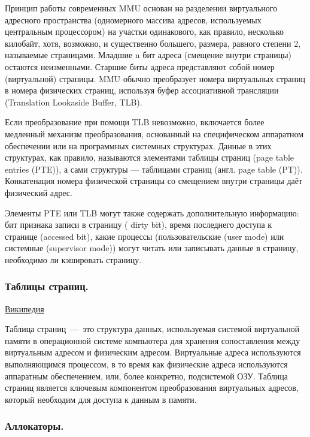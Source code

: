 Принцип работы современных MMU основан на разделении виртуального адресного пространства (одномерного массива адресов, используемых центральным процессором) на участки одинакового, как правило, несколько килобайт, хотя, возможно, и существенно большего, размера, равного степени 2, называемые страницами. Младшие n бит адреса (смещение внутри страницы) остаются неизменными. Старшие биты адреса представляют собой номер (виртуальной) страницы. MMU обычно преобразует номера виртуальных страниц в номера физических страниц, используя буфер ассоциативной трансляции (Translation Lookaside Buffer, TLB).

Если преобразование при помощи TLB невозможно, включается более медленный механизм преобразования, основанный на специфическом аппаратном обеспечении или на программных системных структурах. Данные в этих структурах, как правило, называются элементами таблицы страниц (page table entries (PTE)), а сами структуры — таблицами страниц (англ. page table (PT)). Конкатенация номера физической страницы со смещением внутри страницы даёт физический адрес.

Элементы PTE или TLB могут также содержать дополнительную информацию: бит признака записи в страницу ( dirty bit), время последнего доступа к странице (accessed bit), какие процессы (пользовательские (user mode) или системные (supervisor mode)) могут читать или записывать данные в страницу, необходимо ли кэшировать страницу.

\subsubsection{Таблицы страниц.}

\href{https://ru.wikipedia.org/wiki/%D0%A2%D0%B0%D0%B1%D0%BB%D0%B8%D1%86%D0%B0_%D1%81%D1%82%D1%80%D0%B0%D0%BD%D0%B8%D1%86}{Википедия}

Таблица страниц~---~это структура данных, используемая системой виртуальной памяти в операционной системе компьютера для хранения сопоставления между виртуальным адресом и физическим адресом. Виртуальные адреса используются выполняющимся процессом, в то время как физические адреса используются аппаратным обеспечением, или, более конкретно, подсистемой ОЗУ. Таблица страниц является ключевым компонентом преобразования виртуальных адресов, который необходим для доступа к данным в памяти.

\subsubsection{Аллокаторы.}

